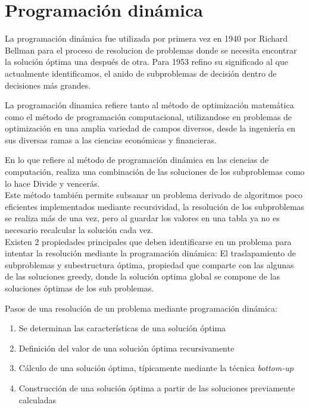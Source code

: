 \section*{Programación dinámica}
    La programación dinámica fue utilizada por primera vez en 1940 por Richard Bellman para el proceso de resolucion de problemas donde se necesita encontrar la solución óptima una después de otra. Para 1953 refino su significado al que actualmente identificamos, el anido de subproblemas de decisión dentro de decisiones más grandes.
    
    La programación dinamica refiere tanto al método de optimización matemática como el método de programación computacional, utilizandose en problemas de optimización en una amplia variedad de campos diversos, desde la ingeniería en sus diversas ramas a las ciencias económicas y financieras.
    
    En lo que refiere al método de programación dinámica en las ciencias de computación, realiza una combinación de las soluciones de los subproblemas como lo hace Divide y vencerás.\\
    
    Este método también permite subsanar un problema derivado de algoritmos poco eficientes implementados mediante recursividad, la resolución de los subproblemas se realiza más de una vez, pero al guardar los valores en una tabla ya no es necesario recalcular la solución cada vez.\\
    
    Existen 2 propiedades principales que deben identificarse en un problema para intentar la resolución mediante la programación dinámica: El traslapamiento de subproblemas y subestructura óptima, propiedad que comparte con las algunas de las soluciones greedy, donde la solución optima global se compone de las soluciones óptimas de los sub problemas.
    
    Pasos de una resolución de un problema mediante programación dinámica:
    \begin{enumerate}
        \item Se determinan las características de una solución óptima
        \item Definición del valor de una solución óptima recursivamente
        \item Cálculo de una solución óptima, típicamente mediante la técnica \textit{bottom-up}
        \item Construcción de una solución óptima a partir de las soluciones previamente calculadas 
    \end{enumerate}
    
